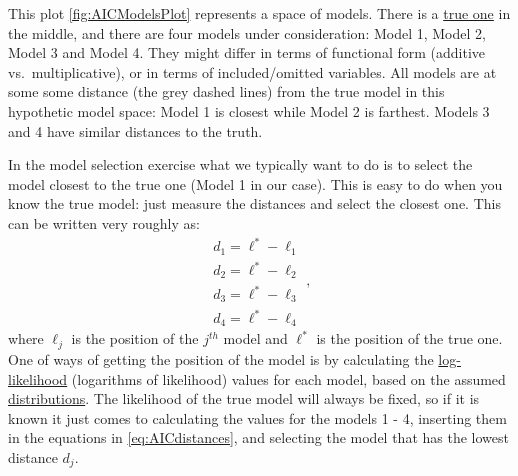 \documentclass[
]{book}
\theoremstyle{definition}
\theoremstyle{definition}
\theoremstyle{definition}
\theoremstyle{definition}
\theoremstyle{remark}
\begin{document}
This plot \ref{fig:AICModelsPlot} represents a space of models. There is a \hyperref[intro]{true one} in the middle, and there are four models under consideration: Model 1, Model 2, Model 3 and Model 4. They might differ in terms of functional form (additive vs.~multiplicative), or in terms of included/omitted variables. All models are at some some distance (the grey dashed lines) from the true model in this hypothetic model space: Model 1 is closest while Model 2 is farthest. Models 3 and 4 have similar distances to the truth.

In the model selection exercise what we typically want to do is to select the model closest to the true one (Model 1 in our case). This is easy to do when you know the true model: just measure the distances and select the closest one. This can be written very roughly as:
\begin{equation}
    \begin{split}
        d_1 = \ell^* - \ell_1 \\
        d_2 = \ell^* - \ell_2 \\
        d_3 = \ell^* - \ell_3 \\
        d_4 = \ell^* - \ell_4
    \end{split} ,
    \label{eq:AICdistances}
\end{equation}
where \(\ell_j\) is the position of the \(j^{th}\) model and \(\ell^*\) is the position of the true one. One of ways of getting the position of the model is by calculating the \hyperref[likelihoodApproach]{log-likelihood} (logarithms of likelihood) values for each model, based on the assumed \hyperref[distributions]{distributions}. The likelihood of the true model will always be fixed, so if it is known it just comes to calculating the values for the models 1 - 4, inserting them in the equations in \eqref{eq:AICdistances}, and selecting the model that has the lowest distance \(d_j\).
\end{document}
